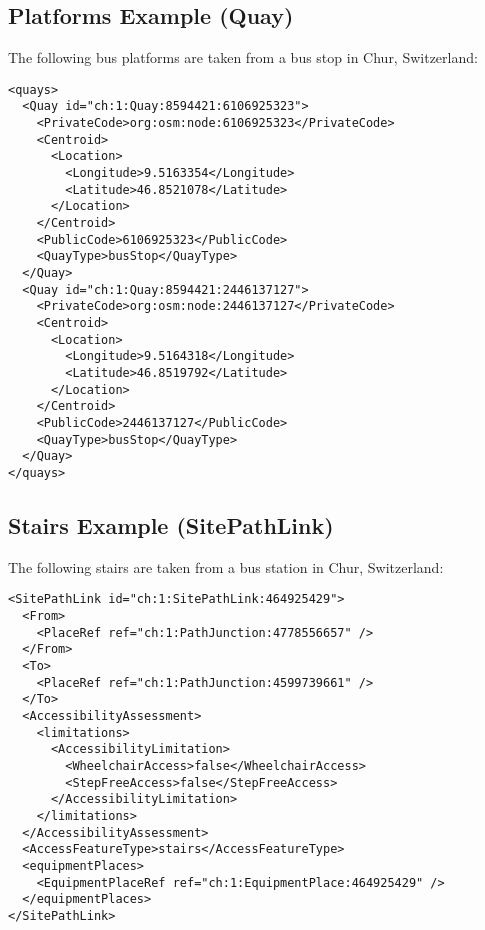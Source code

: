 \subsection{Platforms Example (Quay)}
The following bus platforms are taken from a bus stop in Chur, Switzerland:
\begin{verbatim}
<quays>
  <Quay id="ch:1:Quay:8594421:6106925323">
    <PrivateCode>org:osm:node:6106925323</PrivateCode>
    <Centroid>
      <Location>
        <Longitude>9.5163354</Longitude>
        <Latitude>46.8521078</Latitude>
      </Location>
    </Centroid>
    <PublicCode>6106925323</PublicCode>
    <QuayType>busStop</QuayType>
  </Quay>
  <Quay id="ch:1:Quay:8594421:2446137127">
    <PrivateCode>org:osm:node:2446137127</PrivateCode>
    <Centroid>
      <Location>
        <Longitude>9.5164318</Longitude>
        <Latitude>46.8519792</Latitude>
      </Location>
    </Centroid>
    <PublicCode>2446137127</PublicCode>
    <QuayType>busStop</QuayType>
  </Quay>
</quays>
\end{verbatim}
\newpage
\subsection{Stairs Example (SitePathLink)}
The following stairs are taken from a bus station in Chur, Switzerland:
\begin{verbatim}
<SitePathLink id="ch:1:SitePathLink:464925429">
  <From>
    <PlaceRef ref="ch:1:PathJunction:4778556657" />
  </From>
  <To>
    <PlaceRef ref="ch:1:PathJunction:4599739661" />
  </To>
  <AccessibilityAssessment>
    <limitations>
      <AccessibilityLimitation>
        <WheelchairAccess>false</WheelchairAccess>
        <StepFreeAccess>false</StepFreeAccess>
      </AccessibilityLimitation>
    </limitations>
  </AccessibilityAssessment>
  <AccessFeatureType>stairs</AccessFeatureType>
  <equipmentPlaces>
    <EquipmentPlaceRef ref="ch:1:EquipmentPlace:464925429" />
  </equipmentPlaces>
</SitePathLink>
\end{verbatim}